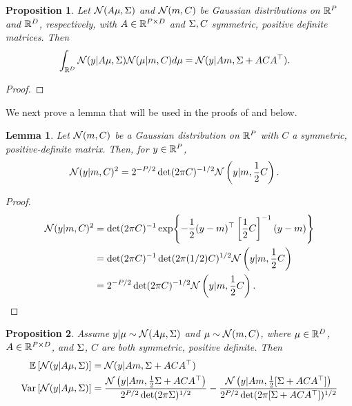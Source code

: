 \documentclass[12pt]{article}
\newtheorem{prop}{Proposition}
\newtheorem{lemma}{Lemma}
\begin{document}
\begin{prop} \label{Gaussian_convolution}
Let $\mathcal{N}(A \mu, \Sigma)$ and $\mathcal{N}(m, C)$ be Gaussian distributions on $\mathbb{R}^{P}$ and $\mathbb{R}^{D}$, 
respectively, with $A \in \mathbb{R}^{P \times D}$ and $\Sigma, C$ symmetric, positive definite matrices. Then 
\begin{align*}
\int_{\mathbb{R}^{D}} \mathcal{N}(y | A \mu, \Sigma) \mathcal{N}(\mu | m, C) d\mu
&= \mathcal{N}(y | Am, \Sigma + ACA^\top). 
\end{align*}
\end{prop}

\begin{proof} 
\todo
\end{proof}

We next prove a lemma that will be used in the proofs of  
and  below. 
\begin{lemma} \label{lemma:squared_Gaussian_density}
Let $\mathcal{N}(m, C)$ be a Gaussian distribution on $\mathbb{R}^{P}$ with $C$ a symmetric, positive-definite 
matrix. Then, for $y \in \mathbb{R}^{P}$, 
\begin{align*}
\mathcal{N}(y | m, C)^2 
&= 2^{-P/2} \det(2\pi C)^{-1/2} \mathcal{N}\left(y | m, \frac{1}{2}C\right). 
\end{align*}
\end{lemma}

\begin{proof}
\begin{align*}
\mathcal{N}(y | m, C)^2 
&= \det(2\pi C)^{-1} \exp\mathopen{}\left\{-\frac{1}{2} (y - m)^\top \left[\frac{1}{2}C \right]^{-1}(y - m)\right\}\mathclose{} \\
&= \det(2\pi C)^{-1} \det(2\pi (1/2)C)^{1/2} \mathcal{N}\left(y | m, \frac{1}{2}C\right) \\
&= 2^{-P/2} \det(2\pi C)^{-1/2} \mathcal{N}\left(y | m, \frac{1}{2}C\right). 
\end{align*}
\end{proof}

\begin{prop} \label{prop:Gaussian_marginal_moments}
Assume $y | \mu \sim \mathcal{N}(A \mu, \Sigma)$ and $\mu \sim \mathcal{N}(m, C)$, where $\mu \in \mathbb{R}^{D}$, 
$A \in \mathbb{R}^{P \times D}$, and $\Sigma$, $C$ are both symmetric, positive definite. Then 
\begin{align}
\mathbb{E}\left[\mathcal{N}(y | A \mu, \Sigma) \right] &= \mathcal{N}(y | Am, \Sigma + ACA^\top) \\
\mathrm{Var}\left[\mathcal{N}(y | A \mu, \Sigma) \right] 
&= \frac{\mathcal{N}\left(y | Am, \frac{1}{2} \Sigma + ACA^\top \right)}{2^{P/2} \det(2\pi \Sigma)^{1/2}} - 
\frac{\mathcal{N}\left(y | Am, \frac{1}{2}[\Sigma + ACA^\top] \right)}{2^{P/2} \det(2\pi[\Sigma + ACA^\top])^{1/2}}
\end{align}
\end{prop}
\end{document}
